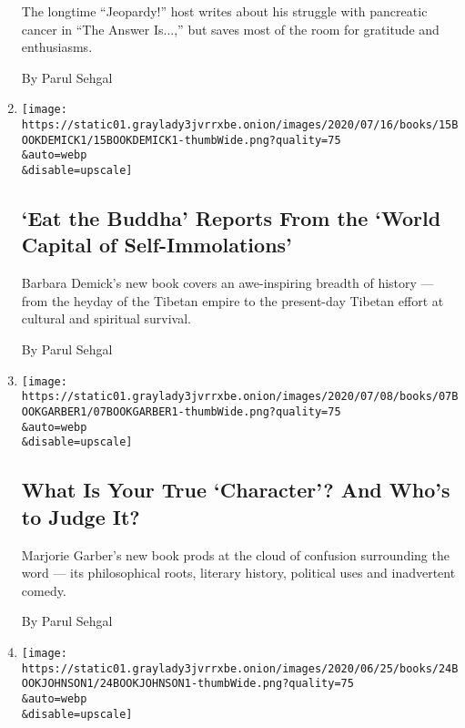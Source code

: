 \begin{enumerate}
  The longtime ``Jeopardy!'' host writes about his struggle with
  pancreatic cancer in ``The Answer Is...,'' but saves most of the room
  for gratitude and enthusiasms.

  By Parul Sehgal
\item
  \href{/2020/07/15/books/eat-buddha-life-death-tibetan-town-barbara-demick.html}{}

  \texttt{[image: https://static01.graylady3jvrrxbe.onion/images/2020/07/16/books/15BOOKDEMICK1/15BOOKDEMICK1-thumbWide.png?quality=75\\\&auto=webp\\\&disable=upscale]}

  \hypertarget{eat-the-buddha-reports-from-the-world-capital-of-self-immolations}{%
  \subsection{`Eat the Buddha' Reports From the `World Capital of
  Self-Immolations'}\label{eat-the-buddha-reports-from-the-world-capital-of-self-immolations}}

  Barbara Demick's new book covers an awe-inspiring breadth of history
  --- from the heyday of the Tibetan empire to the present-day Tibetan
  effort at cultural and spiritual survival.

  By Parul Sehgal
\item
  \href{/2020/07/07/books/review-character-history-cultural-obsession-marjorie-garber.html}{}

  \texttt{[image: https://static01.graylady3jvrrxbe.onion/images/2020/07/08/books/07BOOKGARBER1/07BOOKGARBER1-thumbWide.png?quality=75\\\&auto=webp\\\&disable=upscale]}

  \hypertarget{what-is-your-true-character-and-whos-to-judge-it}{%
  \subsection{What Is Your True `Character'? And Who's to Judge
  It?}\label{what-is-your-true-character-and-whos-to-judge-it}}

  Marjorie Garber's new book prods at the cloud of confusion surrounding
  the word --- its philosophical roots, literary history, political uses
  and inadvertent comedy.

  By Parul Sehgal
\item
  \href{/2020/06/24/books/review-true-history-first-mrs-meredith-diane-johnson.html}{}

  \texttt{[image: https://static01.graylady3jvrrxbe.onion/images/2020/06/25/books/24BOOKJOHNSON1/24BOOKJOHNSON1-thumbWide.png?quality=75\\\&auto=webp\\\&disable=upscale]}


\end{enumerate}

